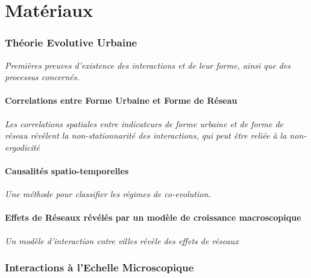 \part{Matériaux}



\section{Théorie Evolutive Urbaine}

\textit{Premières preuves d'existence des interactions et de leur forme, ainsi que des processus concernés.}

\subsection{Correlations entre Forme Urbaine et Forme de Réseau}

\textit{Les correlations spatiales entre indicateurs de forme urbaine et de forme de réseau révèlent la non-stationnarité des interactions, qui peut être reliée à la non-ergodicité}


\subsection{Causalités spatio-temporelles}


\textit{Une méthode pour classifier les régimes de co-evolution.}


\subsection{Effets de Réseaux révélés par un modèle de croissance macroscopique}


\textit{Un modèle d'interaction entre villes révèle des effets de réseaux}



\section{Interactions à l'Echelle Microscopique}

